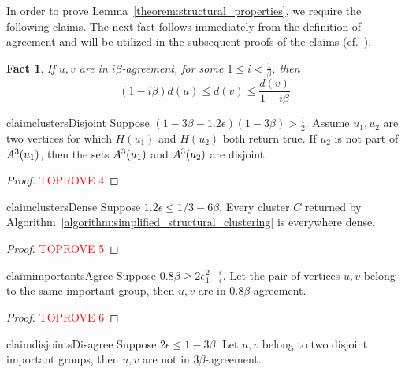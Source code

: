 \documentclass{article}
\newtheorem{fact}[theorem]{Fact}
\begin{document}
In order to prove Lemma~\ref{theorem:structural_properties}, we require the following claims. The next fact follows immediately from the definition of agreement and will be utilized in the subsequent proofs of the claims (cf.~\cite{cohen2021correlation}).

\begin{fact}\label{fact:agreement_facts}
    If $u,v$ are in $i\beta$-agreement, for some $1 \leq i < \frac{1}{\beta}$, then
    \[
    (1-i\beta)d(u) \leq d(v) \leq \frac{d(v)}{1-i\beta}
    \]
\end{fact}

\begin{restatable}{claim}{clustersDisjoint}
\label{claim:clusters_disjoint}
Suppose $(1-3\beta-1.2\epsilon)(1-3\beta) > \frac{1}{2}$.
Assume $u_1, u_2$ are two vertices for which $H(u_1)$ and $H(u_2)$ both return true. 
If $u_2$ is not part of $A^3(u_1)$, then the sets $A^3(u_1)$ and $A^3(u_2)$ are disjoint.
\end{restatable}

\begin{proof}\textcolor{red}{TOPROVE 4}\end{proof}

\begin{restatable}{claim}{clustersDense}
\label{claim:clusters_dense}
    Suppose $1.2\epsilon \leq 1/3-6\beta$. Every cluster $C$ returned by Algorithm~\ref{algorithm:simplified_structural_clustering} is everywhere dense.
\end{restatable}

\begin{proof}\textcolor{red}{TOPROVE 5}\end{proof}

\begin{restatable}{claim}{importantsAgree}
\label{claim:importants_agree}
    Suppose $0.8\beta \geq 2\epsilon\frac{2-\epsilon}{1-\epsilon}$. Let the pair of vertices $u, v$ belong to the same important group, then $u, v$ are in $0.8\beta$-agreement.
\end{restatable}

\begin{proof}\textcolor{red}{TOPROVE 6}\end{proof}

\begin{restatable}{claim}{disjointsDisagree}
\label{claim:disjoints_disagree}
    Suppose $2\epsilon \leq 1-3\beta$. Let $u, v$ belong to two disjoint important groups, then $u, v$ are not in $3\beta$-agreement.
\end{restatable}
\end{document}
